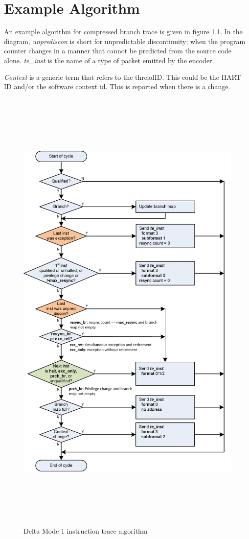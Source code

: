 \chapter{Example Algorithm}

An example algorithm for compressed branch trace is given in figure \ref{fig:algo}. In the diagram, {\textit {unprediscon}} is short for unpredictable discontinuity; when the program counter changes in a manner that cannot be predicted from the source code alone. {\textit {te\_inst}} is the name of a type of packet emitted by the encoder. 

\textit{Context} is a generic term that refers to the threadID. This could be the HART ID and/or the software context id. This is reported when there is a change.

\begin{figure}[l]
\begin{center}
  \includegraphics[height=23cm, width=15cm]{algo.png}
  \caption{Delta Mode 1 instruction trace algorithm}
  \label{fig:algo}
\end{center}
\end{figure}


